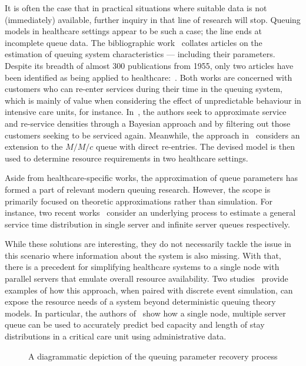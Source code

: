 It is often the case that in practical situations where suitable data is not
(immediately) available, further inquiry in that line of research will stop.
Queuing models in healthcare settings appear to be such a case; the line ends at
incomplete queue data. The bibliographic work~\cite{Asanjarani2017} collates
articles on the estimation of queuing system characteristics --- including their
parameters. Despite its breadth of almost 300 publications from 1955, only two
articles have been identified as being applied to
healthcare:~\cite{Mohammadi2012,Yom2014}. Both works are concerned with
customers who can re-enter services during their time in the queuing system,
which is mainly of value when considering the effect of unpredictable behaviour
in intensive care units, for instance. In~\cite{Mohammadi2012}, the authors seek
to approximate service and re-service densities through a Bayesian approach and
by filtering out those customers seeking to be serviced again. Meanwhile, the
approach in~\cite{Yom2014} considers an extension to the \(M/M/c\) queue with
direct re-entries. The devised model is then used to determine resource
requirements in two healthcare settings.

Aside from healthcare-specific works, the approximation of queue parameters has
formed a part of relevant modern queuing research. However, the scope is
primarily focused on theoretic approximations rather than simulation. For
instance, two recent works~\cite{Djabali2018,Goldenshluger2016} consider an
underlying process to estimate a general service time distribution in single
server and infinite server queues respectively.

While these solutions are interesting, they do not necessarily tackle the issue
in this scenario where information about the system is also missing. With that,
there is a precedent for simplifying healthcare systems to a single node with
parallel servers that emulate overall resource availability. Two
studies~\cite{Steins2013,Williams2015} provide examples of how this approach,
when paired with discrete event simulation, can expose the resource needs of a
system beyond deterministic queuing theory models. In particular, the authors
of~\cite{Williams2015} show how a single node, multiple server queue can be used
to accurately predict bed capacity and length of stay distributions in a
critical care unit using administrative data.

\begin{figure}
    \centering%
    \resizebox{!}{.9\textheight}{%
        
    }
    \caption{%
        A diagrammatic depiction of the queuing parameter recovery process
    }\label{fig:process}
\end{figure}


